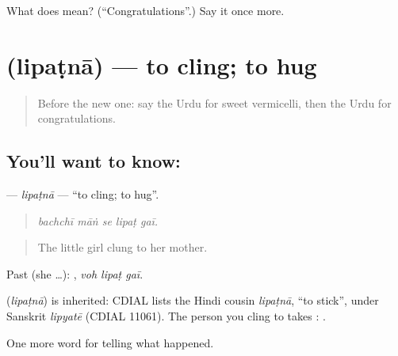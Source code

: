 \begin{tcolorbox}[breakable,colback=teal!4,colframe=teal!35!black,title={Before you move on}]
What does   mean? (\textquotedblleft{}Congratulations\textquotedblright{}.) Say it once more.
\end{tcolorbox}
\section[\texorpdfstring{\ur{لپٹنا} (lipaṭnā)}{لپٹنا (lipaṭnā)}]{ (lipaṭnā) — to cling; to hug}

\label{lesson:UR-C318-lipatna}



\begin{quote}
Before the new one: say the Urdu for sweet vermicelli, then the Urdu for congratulations.
\end{quote}

\subsection*{You'll want to know: }
\textbf{} — \emph{lipaṭnā} — \textquotedblleft{}to cling; to hug\textquotedblright{}.

\begin{quote}
    
\end{quote}

\begin{quote}
\emph{bachchī māṅ se lipaṭ gaī.}
\end{quote}

\begin{quote}
The little girl clung to her mother.
\end{quote}

Past (she …):   , \emph{voh lipaṭ gaī}.

\begin{cousinweb}
\textbf{} (\emph{lipaṭnā}) is inherited: CDIAL lists the Hindi cousin \emph{lipaṭnā}, \textquotedblleft{}to stick\textquotedblright{}, under Sanskrit \emph{lipyatē} (CDIAL 11061). The person you cling to takes \textbf{}: \textbf{   }.
\end{cousinweb}

\begin{grammarlens}[title={What you've built}]
One more word for telling what happened.
\end{grammarlens}


